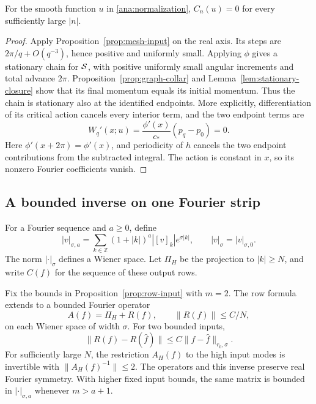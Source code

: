 \begin{lemma}\label{ana:vanishing}
For the smooth function \(u\) in \eqref{ana:normalization},
\(C_n(u)=0\) for every sufficiently large \(|n|\).
\end{lemma}

\begin{proof}
Apply Proposition~\ref{prop:mesh-input} on the real axis.
Its steps are \(2\pi/q+O(q^{-3})\), hence positive and uniformly
small.  Applying \(\phi\) gives a stationary chain for \(\mathcal{S}\),
with positive uniformly small angular increments and total advance
\(2\pi\).  Proposition~\ref{prop:graph-collar} and
Lemma~\ref{lem:stationary-closure} show that its final momentum equals
its initial momentum.  Thus the chain is stationary also at the
identified endpoints.  More explicitly, differentiation of its
critical action cancels every interior term, and the two endpoint
terms are
\[
 W_q'(x;u)=\frac{\phi'(x)}{c_*}(p_q-p_0)=0.
\]
Here \(\phi'(x+2\pi)=\phi'(x)\), and periodicity of \(h\) cancels
the two endpoint contributions from the subtracted integral.  The
action is constant in \(x\), so its nonzero Fourier coefficients vanish.
\end{proof}

\subsection{A bounded inverse on one Fourier strip}

For a Fourier sequence and \(a\ge0\), define
\[
 |v|_{\sigma,a}=\sum_{k\in\mathbb Z}
 (1+|k|)^a|[v]_k|e^{\sigma|k|},\qquad
 |v|_\sigma=|v|_{\sigma,0}.
\]
The norm \(|\cdot|_\sigma\) defines a Wiener space.  Let \(\Pi_H\)
be the projection to \(|k|\ge N\), and write \(C(f)\) for the
sequence of these output rows.

\begin{lemma}\label{ana:wiener}
Fix the bounds in Proposition~\ref{prop:row-input} with \(m=2\).
The row formula extends to a bounded Fourier operator
\[
 A(f)=\Pi_H+R(f),\qquad
 \|R(f)\|\le C/N,
\]
on each Wiener space of width \(\sigma\).  For two bounded inputs,
\[
 \|R(f)-R(\widehat f)\|
 \le C\|f-\widehat f\|_{r_0,\sigma}.
\]
For sufficiently large \(N\), the restriction \(A_H(f)\) to the
high input modes is invertible with \(\|A_H(f)^{-1}\|\le2\).
The operators and this inverse preserve real Fourier symmetry.
With higher fixed input bounds, the same matrix is bounded in
\(|\cdot|_{\sigma,a}\) whenever \(m>a+1\).
\end{lemma}

